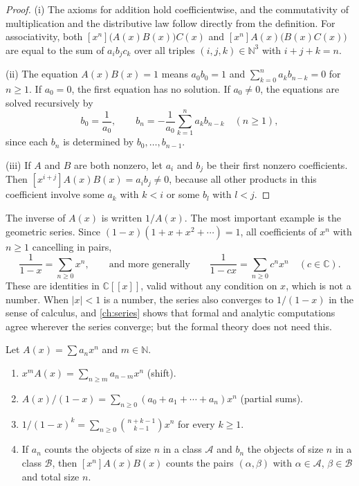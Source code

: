 \begin{proof}
(i) The axioms for addition hold coefficientwise, and the commutativity of multiplication and the distributive law follow directly from the definition. For associativity, both $[x^n]\bigl(A(x)B(x)\bigr)C(x)$ and $[x^n]A(x)\bigl(B(x)C(x)\bigr)$ are equal to the sum of $a_ib_jc_k$ over all triples $(i,j,k)\in\mathbb N^3$ with $i+j+k=n$.

(ii) The equation $A(x)B(x)=1$ means $a_0b_0=1$ and $\sum_{k=0}^{n}a_kb_{n-k}=0$ for $n\ge1$. If $a_0=0$, the first equation has no solution. If $a_0\ne0$, the equations are solved recursively by
\[
b_0=\frac1{a_0},\qquad b_n=-\frac1{a_0}\sum_{k=1}^{n}a_kb_{n-k}\quad(n\ge1),
\]
since each $b_n$ is determined by $b_0,\ldots,b_{n-1}$.

(iii) If $A$ and $B$ are both nonzero, let $a_i$ and $b_j$ be their first nonzero coefficients. Then $[x^{i+j}]A(x)B(x)=a_ib_j\ne0$, because all other products in this coefficient involve some $a_k$ with $k<i$ or some $b_l$ with $l<j$.
\end{proof}

The inverse of $A(x)$ is written $1/A(x)$. The most important example is the geometric series. Since $(1-x)(1+x+x^2+\cdots)=1$, all coefficients of $x^n$ with $n\ge1$ cancelling in pairs,
\begin{equation}
\frac1{1-x}=\sum_{n\ge0}x^n,\qquad\text{and more generally}\qquad\frac1{1-cx}=\sum_{n\ge0}c^nx^n\quad(c\in\mathbb C).
\label{eq:geometric-series}
\end{equation}
These are identities in $\mathbb C[[x]]$, valid without any condition on $x$, which is not a number. When $|x|<1$ is a number, the series also converges to $1/(1-x)$ in the sense of calculus, and \cref{ch:series} shows that formal and analytic computations agree wherever the series converge; but the formal theory does not need this.

\begin{proposition}
\label{prop:gf-rules}
Let $A(x)=\sum a_nx^n$ and $m\in\mathbb N$.
\begin{enumerate}
\item $x^mA(x)=\sum_{n\ge m}a_{n-m}x^n$ (shift).
\item $A(x)/(1-x)=\sum_{n\ge0}(a_0+a_1+\cdots+a_n)x^n$ (partial sums).
\item $1/(1-x)^k=\sum_{n\ge0}\binom{n+k-1}{k-1}x^n$ for every $k\ge1$.
\item If $a_n$ counts the objects of size $n$ in a class $\mathcal A$ and $b_n$ the objects of size $n$ in a class $\mathcal B$, then $[x^n]A(x)B(x)$ counts the pairs $(\alpha,\beta)$ with $\alpha\in\mathcal A$, $\beta\in\mathcal B$ and total size $n$.
\end{enumerate}
\end{proposition}

